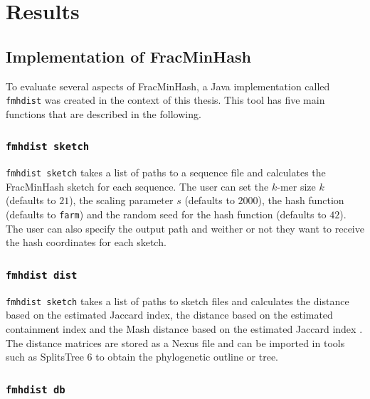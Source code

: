
\chapter{Results}
  \label{sec:res}

\section{Implementation of FracMinHash}
To evaluate several aspects of FracMinHash, a Java implementation called
\texttt{fmhdist} was created in the context of this thesis. This tool has five
main functions that are described in the following.

\subsection*{\texttt{fmhdist sketch}}

\texttt{fmhdist sketch} takes a list of paths to a sequence file and calculates
the FracMinHash sketch for each sequence. The user can set the $k$-mer size $k$
(defaults to $21$), the scaling parameter $s$ (defaults to $2000$), the hash
function (defaults to \texttt{farm}) and the random seed for the hash function
(defaults to $42$). The user can also specify the output path and weither or not
they want to receive the hash coordinates for each sketch.

\subsection*{\texttt{fmhdist dist}}

\texttt{fmhdist sketch} takes a list of paths to sketch files and calculates the
distance based on the estimated Jaccard index, the distance based on the
estimated containment index
\cite{heraDerivingConfidenceIntervals2023,irberLightweightCompositionalAnalysis2022}
and the Mash distance based on the estimated Jaccard index
\cite{ondovMashFastGenome2016}. The distance matrices are stored as a Nexus file
and can be imported in tools such as SplitsTree 6 to obtain the phylogenetic
outline or tree.

\subsection*{\texttt{fmhdist db}}

